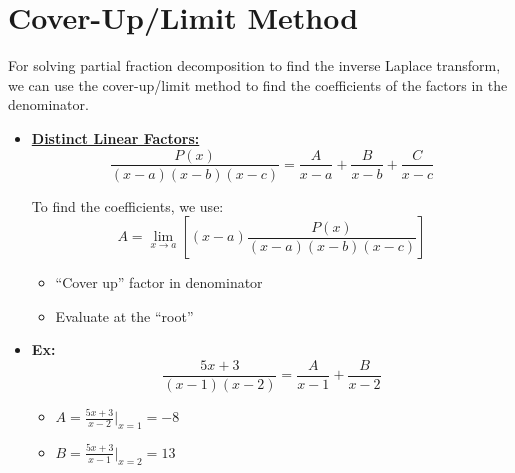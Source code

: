\documentclass[12pt]{article}
\begin{document}
\section*{Cover-Up/Limit Method}
For solving partial fraction decomposition to find the inverse Laplace transform, we can use the cover-up/limit method to find the coefficients of the factors in the denominator. 
\begin{itemize}
    \item \underline{\textbf{Distinct Linear Factors:}}
    \[ \frac{P(x)}{(x-a)(x-b)(x-c)} = \frac{A}{x-a} + \frac{B}{x-b} + \frac{C}{x-c} \]
    
    To find the coefficients, we use:
    \[A = \lim_{x \to a} \left[ (x-a) \frac{P(x)}{(x-a)(x-b)(x-c)} \right]\]
    \begin{itemize}
        \item ``Cover up'' factor in denominator
        \item Evaluate at the ``root''
    \end{itemize}

    \item \textbf{Ex:}
    \[ \frac{5x+3}{(x-1)(x-2)} = \frac{A}{x-1} + \frac{B}{x-2} \]
    \begin{itemize}
        \item[] $A = \frac{5x+3}{x-2} \Big|_{x=1} = -8$
        \item[] $B = \frac{5x+3}{x-1} \Big|_{x=2} = 13$
    \end{itemize}
\end{itemize}
\end{document}
